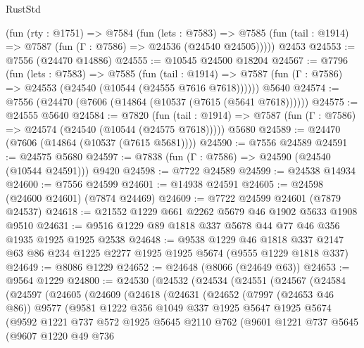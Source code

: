 \begin{lexlean}{RustStd}
\begin{coremodule}
    (fun (rty : @1751) =>
    @7584
      (fun (lets : @7583) =>
      @7585 (fun (tail : @1914) => @7587 (fun (Γ : @7586) => @24536 (@24540 @24505)))))
    @2453
@24553 := @7556 (@24470 @14886)
@24555 := @10545 @24500 @18204
@24567 := @7796
    (fun (lets : @7583) =>
    @7585
      (fun (tail : @1914) =>
      @7587 (fun (Γ : @7586) => @24553 (@24540 (@10544 (@24555 @7616 @7618))))))
    @5640
@24574 := @7556 (@24470 (@7606 (@14864 (@10537 (@7615 (@5641 @7618))))))
@24575 := @24555 @5640
@24584 := @7820
    (fun (tail : @1914) => @7587 (fun (Γ : @7586) => @24574 (@24540 (@10544 (@24575 @7618)))))
    @5680
@24589 := @24470 (@7606 (@14864 (@10537 (@7615 @5681))))
@24590 := @7556 @24589
@24591 := @24575 @5680
@24597 := @7838 (fun (Γ : @7586) => @24590 (@24540 (@10544 @24591))) @9420
@24598 := @7722 @24589
@24599 := @24538 @14934
@24600 := @7556 @24599
@24601 := @14938 @24591
@24605 := @24598 (@24600 @24601) (@7874 @24469)
@24609 := @7722 @24599 @24601 (@7879 @24537)
@24618 := @21552 @1229 @661 @2262 @5679 @46 @1902 @5633 @1908 @9510
@24631 := @9516 @1229 @89 @1818 @337 @5678 @44 @77 @46 @356 @1935 @1925 @1925 @2538
@24648 := @9538
    @1229
    @46
    @1818
    @337
    @2147
    @63
    @86
    @234
    @1225
    @2277
    @1925
    @1925
    @5674
    (@9555 @1229 @1818 @337)
@24649 := @8086 @1229
@24652 := @24648 (@8066 (@24649 @63))
@24653 := @9564 @1229
@24800 := @24530
    (@24532
      (@24534
        (@24551
          (@24567
            (@24584
              (@24597
                (@24605
                  (@24609
                    (@24618
                      (@24631
                        (@24652
                          (@7997 (@24653 @46 @86))
                          @9577
                          (@9581
                            @1222
                            @356
                            @1049
                            @337
                            @1925
                            @5647
                            @1925
                            @5674
                            (@9592
                              @1221
                              @737
                              @572
                              @1925
                              @5645
                              @2110
                              @762
                              (@9601
                                @1221
                                @737
                                @5645
                                (@9607
                                  @1220
                                  @49
                                  @736

\end{coremodule}
\end{lexlean}
